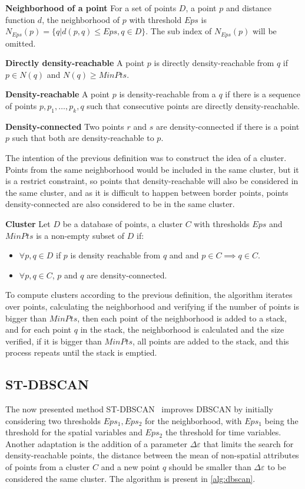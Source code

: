 \textbf{Neighborhood of a point} For a set of points $D$, a point $p$ and distance function $d$, the neighborhood of $p$ with threshold $Eps$ is $N_{Eps}(p) = \{ q | d(p, q) \leq Eps, q \in D \}$. The sub index of $N_{Eps}(p)$ will be omitted.
%

\textbf{Directly density-reachable} A point $p$ is directly density-reachable from $q$ if $p \in N(q)$ and $N(q) \geq MinPts$.
%

\textbf{Density-reachable} A point $p$ is density-reachable from a $q$ if there is a sequence of points $p, p_1, \dots, p_k, q$ such that consecutive points are directly density-reachable.
%

\textbf{Density-connected} Two points $r$ and $s$ are density-connected if there is a point $p$ such that both are density-reachable to $p$.
%

The intention of the previous definition was to construct the idea of a cluster.  
%
Points from the same neighborhood would be included in the same cluster, but it is a restrict constraint, so points that density-reachable will also be considered in the same cluster, and as it is difficult to happen between border points, points density-connected are also considered to be in the same cluster.
%

\textbf{Cluster} Let $D$ be a database of points, a cluster $C$ with thresholds $Eps$ and $MinPts$ is a non-empty subset of $D$ if:
\begin{itemize}
    \item $\forall p, q \in D$ if $p$ is density reachable from $q$ and and $p \in C \implies q \in C$.
    \item $\forall p, q \in C$, $p$ and $q$ are density-connected.
\end{itemize}
%

To compute clusters according to the previous definition, the algorithm iterates over points, calculating the neighborhood and verifying if the number of points is bigger than $MinPts$, then each point of the neighborhood is added to a stack, and for each point $q$ in the stack, the neighborhood is calculated and the size verified, if it is bigger than $MinPts$, all points are added to the stack, and this process repeats until the stack is emptied.

\subsection{ST-DBSCAN}

The now presented method ST-DBSCAN~\cite{BIRANT2007208} improves DBSCAN by initially considering two thresholds $Eps_1, Eps_2$ for the neighborhood, with $Eps_1$ being the threshold for the spatial variables and $Eps_2$ the threshold for time variables. Another adaptation is the addition of a parameter $\Delta \varepsilon$ that limits the search for density-reachable points, the distance between the mean of non-spatial attributes of points from a cluster $C$ and a new point $q$ should be smaller than $\Delta \varepsilon$ to be considered the same cluster. The algorithm is present in \ref{alg:dbscan}.

